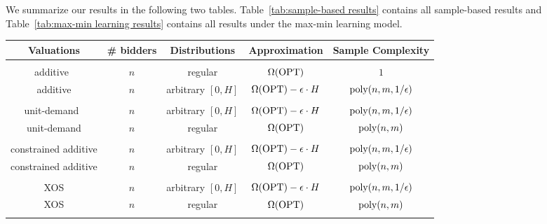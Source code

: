 We summarize our results in the following two tables. Table~\ref{tab:sample-based results} contains all sample-based results and Table~\ref{tab:max-min learning results} contains all results under the max-min learning model. %
\begin{table}[h]
	\centering
		\begin{tabular}{c || c | c| c| c}
			
			\hline\hline
			Valuations & \# bidders &   Distributions  & Approximation  & Sample Complexity \\
						\hline
												&&&&\\

									 additive~\cite{GoldnerK16} &  $n$  & regular & $\Omega(\text{OPT})$ & $1$ \\	
			  additive &  $n$  & arbitrary $[0,H]$ & $\Omega(\text{OPT})-\epsilon\cdot H$ & ${\rm poly}(n,m,1/\epsilon)$	\\					\hline
						&&&&\\

			unit-demand~\cite{MorgensternR16} &  $n$ & arbitrary $[0,H]$ & $\Omega(\text{OPT})-\epsilon\cdot H$ & ${\rm poly}(n,m,1/\epsilon)$\\
			unit-demand &  $n$ & regular & $\Omega(\text{OPT})$ & ${\rm poly}(n,m)$ \\
				\hline
										&&&&\\

			constrained additive &  $n$ &	 arbitrary $[0,H]$ & $\Omega(\text{OPT})-\epsilon\cdot H$ & ${\rm poly}(n,m,1/\epsilon)$ \\

			constrained additive &  $n$ &	regular & $\Omega(\text{OPT})$ & ${\rm poly}(n,m)$\\
			\hline
										&&&&\\
										XOS &  $n$ &	 arbitrary $[0,H]$ & $\Omega(\text{OPT})-\epsilon\cdot H$ & ${\rm poly}(n,m,1/\epsilon)$\\

			XOS &  $n$ &	regular & $\Omega(\text{OPT})$ & ${\rm poly}(n,m)$\\
			\hline
										&&&&\\


\end{tabular}
\end{table}
